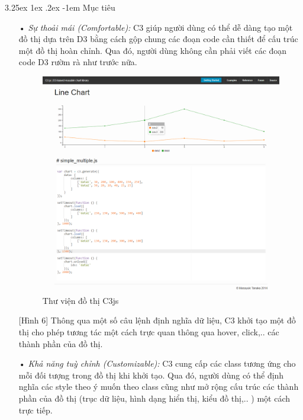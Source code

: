 \documentclass[12pt,a4paper]{article}
\makeatletter
\newcommand{\myparagraph}[1]{\paragraph{#1}\mbox{}\\} %
\renewcommand\paragraph{\@startsection{paragraph}{5}{\z@}%
  {3.25ex \@plus1ex \@minus.2ex}%
  {-1em}%
  {\normalfont\normalsize\bfseries}}
\makeatother
\begin{document}
\myparagraph{Mục tiêu}
\begin{itemize}
    \item[•] \emph{Sự thoải mái (Comfortable):} C3 giúp người dùng có thể dễ dàng tạo một đồ thị dựa trên D3 bằng cách gộp chung các đoạn code cần thiết để cấu trúc một đồ thị hoàn chỉnh. Qua đó, người dùng không cần phải viết các đoạn code D3 rườm rà như trước nữa.
    
\begin{figure}[htp]
	\begin{center}
    \includegraphics[scale=.3]{image/c3syntax}
    \caption{Thư viện đồ thị C3js}
    \label{fig:c3syntax}
	\end{center}
\end{figure}

[Hình 6] Thông qua một số câu lệnh định nghĩa dữ liệu, C3 khởi tạo một đồ thị cho phép tương tác một cách trực quan thông qua hover, click,.. các thành phần của đồ thị.

    \item[•] \emph{Khả năng tuỳ chỉnh (Customizable):} C3 cung cấp các class tương ứng cho mỗi đối tượng trong đồ thị khi khởi tạo. Qua đó, người dùng có thể định nghĩa các style theo ý muốn theo class cũng như mở rộng cấu trúc các thành phần của đồ thị (trục dữ liệu, hình dạng hiển thị, kiểu đồ thị,.. ) một cách trực tiếp.
    

\end{itemize}
\end{document}

